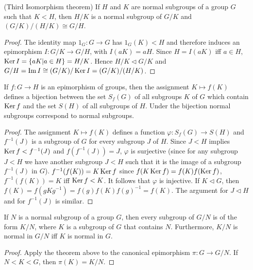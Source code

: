 \begin{Corollary}(Third Isomorphism theorem)
	If $ H $ and $ K $ are normal subgroups of a group $ G $ such that $ K<H $, then $ H /K $ is a normal subgroup of $ G/K $ and $ (G/K)/(H/K)\cong G/H $.
\end{Corollary}
\begin{proof}
	The identity map $ 1_G:G \to G $ has $ 1_G(K)<H $ and therefore induces an epimorphism $ I:G/K \to G/H $, with $ I(aK)=aH $. Since $ H=I(aK) $ iff $ a \in H $, $ \operatorname{Ker} I = \{aK|a \in H \}=H/K $. Hence $ H/K \vartriangleleft G/K $ and $ G/H=\operatorname{Im} I \cong (G/K)/\operatorname{Ker} I = (G/K)/(H/K) $.
\end{proof}
\begin{theorem}
	If $ f:G \to H $ is an epimorphism of groups, then the assignment $ K \mapsto f(K) $ defines a bijection between the set $ S_f(G) $ of all subgroups $ K $ of $ G $ which contain $ \operatorname{Ker} f $ and the set $ S(H) $ of all subgroups of $ H $. Under the bijection normal subgroups correspond to normal subgroups.
\end{theorem}
\begin{proof}
	The assignment $ K \mapsto f(K)$ defines a function $ \varphi: S_f(G)\to S(H) $ and $ f^{-1}(J) $ is a subgroup of $ G $ for every subgroup $ J $ of $ H $. Since $ J<H $ implies $ \operatorname{Ker} f <f^{-1}(J) $ and $ f(f^{-1}(J))=J $, $ \varphi $ is surjective (since for any subgroup $ J<H $ we have another subgroup $ J<H $ such that it is the image of a subgroup $ f^{-1}(J) $ in $ G $). $ f^{-1}(f(K))=K \operatorname{Ker} f $ since $ f(K \operatorname{Ker} f )=f(K) f(\operatorname{Ker} f) $, $ f^{-1}(f(K))=K $ iff $ \operatorname{Ker} f <K $. It follows that $ \varphi $ is injective. If $ K \vartriangleleft G $, then $ f(K) = f(gKg^{-1})=f(g)f(K)f(g)^{-1}= f(K) $. The argument for $ J \vartriangleleft H$ and for $ f^{-1}(J) $ is similar.
\end{proof}

\begin{Corollary}
	If $ N $ is a normal subgroup of a group $ G $, then every subgroup of $ G/N $ is of the form $ K/N $, where $ K $ is a subgroup of $ G $ that contains $ N $. Furthermore, $ K/N $ is normal in $ G/N $ iff $ K $ is normal in $ G $.
\end{Corollary}
\begin{proof}
	Apply the theorem above to the canonical epimorphism $ \pi :G\to G/N $. If $ N<K<G $, then $ \pi(K)=K/N $.
\end{proof}











